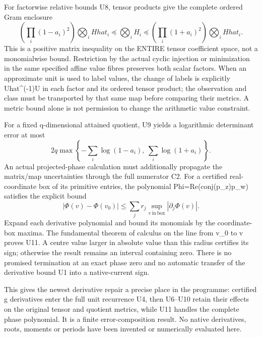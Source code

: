 For factorwise relative bounds U8, tensor products give the complete ordered Gram enclosure \[
 \left(\prod_i(1-a_i)^2\right)\bigotimes_iHhat_i
 \preceq\bigotimes_iH_i
 \preceq
 \left(\prod_i(1+a_i)^2\right)\bigotimes_iHhat_i.\tag{U9}
\] This is a positive matrix inequality on the ENTIRE tensor coefficient space, not a monomialwise bound. Restriction by the actual cyclic injection or minimization in the same specified affine value fibres preserves both scalar factors. When an approximate unit is used to label values, the change of labels is explicitly Uhat\^{}(-1)U in each factor and its ordered tensor product; the observation and class must be transported by that same map before comparing their metrics. A metric bound alone is not permission to change the arithmetic value constraint.

For a fixed q-dimensional attained quotient, U9 yields a logarithmic determinant error at most \[
 2q\max\left\{-\sum_i\log(1-a_i),\ \sum_i\log(1+a_i)\right\}.
 \tag{U10}
\] An actual projected-phase calculation must additionally propagate the matrix/map uncertainties through the full numerator C2. For a certified real-coordinate box of its primitive entries, the polynomial Phi=Re(conj(p\_z)p\_w) satisfies the explicit bound \[
 |\Phi(v)-\Phi(v_0)|\le\sum_j r_j\sup_{v\ \mathrm{in\ box}}|\partial_j\Phi(v)|.\tag{U11}
\] Expand each derivative polynomial and bound its monomials by the coordinate-box maxima. The fundamental theorem of calculus on the line from v\_0 to v proves U11. A centre value larger in absolute value than this radius certifies its sign; otherwise the result remains an interval containing zero. There is no promised termination at an exact phase zero and no automatic transfer of the derivative bound U1 into a native-current sign.

This gives the newest derivative repair a precise place in the programme: certified g derivatives enter the full unit recurrence U4, then U6--U10 retain their effects on the original tensor and quotient metrics, while U11 handles the complete phase polynomial. It is a finite error-composition result. No native derivatives, roots, moments or periods have been invented or numerically evaluated here.
